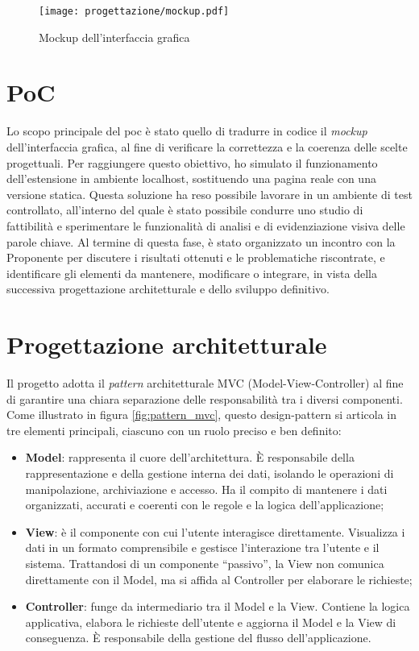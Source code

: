\begin{figure}[H]
  \centering 
  \texttt{[image: progettazione/mockup.pdf]} 
  \caption{Mockup dell'interfaccia grafica}
  \label{fig:mockup}
\end{figure}

\section{PoC}
\label{sec:poc}

\par Lo scopo principale del \gls{poc} è stato quello di tradurre in codice il \textit{mockup} dell’interfaccia grafica, al fine di verificare la correttezza e la coerenza delle scelte progettuali. Per raggiungere questo obiettivo, ho simulato il funzionamento dell’estensione in ambiente \gls{localhost}, sostituendo una pagina reale con una versione statica. Questa soluzione ha reso possibile lavorare in un ambiente di test controllato, all’interno del quale è stato possibile condurre uno studio di fattibilità e sperimentare le funzionalità di analisi e di evidenziazione visiva delle parole chiave. Al termine di questa fase, è stato organizzato un incontro con la Proponente per discutere i risultati ottenuti e le problematiche riscontrate, e identificare gli elementi da mantenere, modificare o integrare, in vista della successiva progettazione architetturale e dello sviluppo definitivo.

\section{Progettazione architetturale}
\label{sec:progettazione}

\par Il progetto adotta il \textit{pattern} architetturale MVC (Model-View-Controller) al fine di garantire una chiara separazione delle responsabilità tra i diversi componenti. Come illustrato in figura \ref{fig:pattern_mvc}, questo \gls{design-pattern} si articola in tre elementi principali, ciascuno con un ruolo preciso e ben definito:
\begin{itemize}
  \item \textbf{Model}: rappresenta il cuore dell’architettura. È responsabile della rappresentazione e della gestione interna dei dati, isolando le operazioni di manipolazione, archiviazione e accesso. Ha il compito di mantenere i dati organizzati, accurati e coerenti con le regole e la logica dell’applicazione;
  \item \textbf{View}: è il componente con cui l’utente interagisce direttamente. Visualizza i dati in un formato comprensibile e gestisce l’interazione tra l’utente e il sistema. Trattandosi di un componente “passivo”, la View non comunica direttamente con il Model, ma si affida al Controller per elaborare le richieste;
  \item \textbf{Controller}: funge da intermediario tra il Model e la View. Contiene la logica applicativa, elabora le richieste dell’utente e aggiorna il Model e la View di conseguenza. È responsabile della gestione del flusso dell’applicazione.
\end{itemize}

